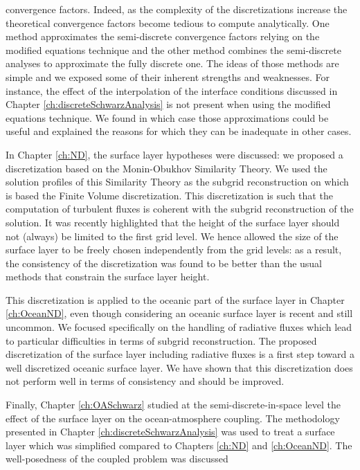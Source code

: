 convergence factors.
Indeed, as the complexity of the discretizations increase the
theoretical convergence factors become tedious to
compute analytically.
One method approximates the semi-discrete convergence factors
relying on the modified equations technique and
the other method combines the semi-discrete analyses
to approximate the fully discrete one.
The ideas of those methods are simple and we exposed some
of their inherent strengths and weaknesses.
For instance, the effect of the interpolation of the interface
conditions discussed in Chapter \ref{ch:discreteSchwarzAnalysis}
is not present when using the modified equations technique.
We found in which case those approximations could be useful and
explained the reasons for which they can be inadequate in other
cases.
\par
In Chapter \ref{ch:ND}, the surface layer hypotheses were discussed:
we proposed a discretization based on the Monin-Obukhov Similarity
Theory.
We used the solution profiles of this Similarity Theory
as the subgrid reconstruction on which is based
the Finite Volume discretization.
This discretization
is such that the computation of turbulent fluxes is coherent
with the subgrid reconstruction of the solution.
It was recently highlighted that the height of the
surface layer should not (always) be limited to the first grid level.
We hence allowed the size of the surface layer to be freely chosen 
independently from the grid levels: as a result, the
consistency of the discretization was found to be better than
the usual methods that constrain the surface layer height.
\par
This discretization is applied to the oceanic part of the surface
layer in Chapter \ref{ch:OceanND}, even though considering an oceanic
surface layer is recent and still uncommon. We focused specifically
on the handling of radiative fluxes which lead to particular
difficulties in terms of subgrid reconstruction. The proposed
discretization of the surface layer including radiative fluxes
is a first step toward a well discretized oceanic surface layer.
We have shown that this discretization does not perform well in
terms of consistency and should be improved.
\par
Finally, Chapter \ref{ch:OASchwarz} studied at the
semi-discrete-in-space level the effect of the surface layer on the
ocean-atmosphere coupling.
The methodology presented in Chapter \ref{ch:discreteSchwarzAnalysis}
was used to treat a surface layer which was simplified compared to
Chapters \ref{ch:ND} and \ref{ch:OceanND}.
The well-posedness of the coupled problem was discussed
